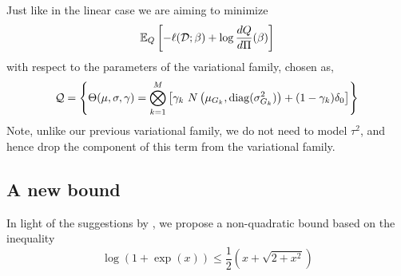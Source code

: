 Just like in the linear case we are aiming to minimize
\begin{equation} \label{eq:l_opt_objective} 
    \mathbb{E}_Q \left[ 
	- \ell(\mathcal{D}; \beta) + \log \frac{dQ}{d\Pi}(\beta) 
    \right]
\end{equation}
with respect to the parameters of the variational family, chosen as,
\begin{equation}
    \mathcal{Q} =
    \left\{ \Theta(\mu, \sigma, \gamma) = 
	\bigotimes_{k=1}^M 
	\left[ 
	    \gamma_k\ N\left(\mu_{G_k}, \operatorname{diag}(\sigma_{G_k}^2) \right) + 
	    (1-\gamma_k) \delta_0
	\right] 
    \right\} \\
\end{equation}
Note, unlike our previous variational family, we do not need to model $\tau^2$, and hence drop the component of this term from the variational family.

\subsection{A new bound}

In light of the suggestions by \cite{Depraetere2017a}, we propose a non-quadratic bound based on the inequality 
\begin{equation} \label{eq:logistic_bound}
\log(1 + \exp(x)) \leq \frac{1}{2} \left( x + \sqrt{2 + x^2} \right)
\end{equation}

